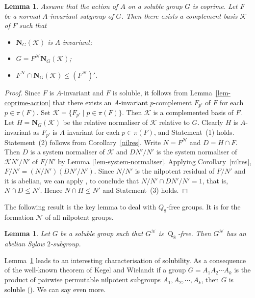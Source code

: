\documentclass[12pt,a4paper]{article}
\DeclareMathOperator{\Q}{Q}
\newtheorem{lemma}[theorem]{Lemma}
\theoremstyle{definition}
\begin{document}
\begin{lemma}\label{lem-complement}
Assume that the action of $A$ on a soluble group $G$ is coprime. Let $F$ be a normal $A$-invariant subgroup of $G$. Then there exists a complement basis $\mathcal{K}$ of $F$ such that
\begin{itemize}
\item[(1)] $\mathbf{N}_G(\mathcal{K})$ is $A$-invariant;
\item[(2)] $G=F^{\mathcal{N}}\mathbf{N}_G(\mathcal{K})$;
\item[(3)] $F^{\mathcal{N}} \cap  \mathbf{N}_G(\mathcal{K}) \leq (F^{\mathcal{N}})'$.
\end{itemize}
\end{lemma}
\begin{proof}
Since $F$ is $A$-invariant and $F$ is soluble,  it follows from Lemma~\ref{lem-coprime-action} that there exists an $A$-invariant $p$-complement $F_{p'}$ of $F$ for each $p \in \pi(F)$. Set $\mathcal{K}=\{F_{p'} \mid  p \in \pi(F)\}$. Then $\mathcal{K}$ is a complemented basis of $F$. Let $H = \mathbf{N}_G(\mathcal{K})$ be the relative normaliser of $\mathcal{K}$ relative to $G$. Clearly $H$ is $A$-invariant as $F_{p'}$ is $A$-invariant for each $p \in \pi(F)$, and Statement~(1) holds.
Statement~(2) follows from Corollary~\ref{nilres}. Write $N=F^{\mathcal{N}}$ and $D = H \cap F$. Then $D$ is a system normaliser of $\mathcal{K}$ and $DN'/N'$ is the system normaliser of
$\mathcal{K}N'/N'$ of $F/N'$ by Lemma~\ref{lem-system-normaliser}. Applying Corollary~\ref{nilres}, $F/N' = (N/N')(DN'/N')$. Since $N/N'$ is the nilpotent residual of $F/N'$ and it is abelian, we can apply \cite[Theorems~IV.5.18 and~V.4.2]{DoerkHawkes1992}, to conclude that $N/N' \cap DN'/N' = 1$, that is, $N \cap D \leq N'$. Hence $N \cap H \leq N'$ and Statement~(3) holds.
\end{proof}


The following result is the key lemma to deal with $Q_8$-free groups. It is \cite[Theorem~4]{SeitzWright1969} for the formation $\mathcal{N}$ of all nilpotent groups.
\begin{lemma}\label{lem-Q8-free}
Let $G$ be a soluble group such that $G^{\mathcal{N}}$ is $\Q_8$-free. Then $G^{\mathcal{N}}$ has an abelian Sylow $2$-subgroup.
\end{lemma}



Lemma~\ref{lem-complement} leads to an interesting characterisation of solubility. As a consequence of the well-known theorem of Kegel and Wielandt if a group $G=A_1A_2\cdots A_k$ is the product of pairwise permutable nilpotent subgroups $A_1,A_2,\cdots,A_k$, then $G$ is soluble (\cite[Corollary~2.4.4]{AFG}). We can say even more.
\end{document}

